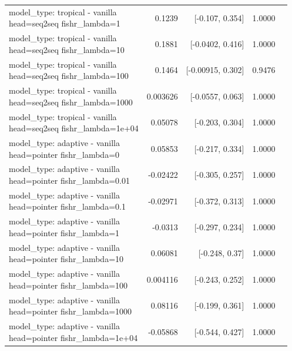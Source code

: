 \documentclass[10pt]{article}
\makeatletter
\newcommand{\stackcell}[1]{\begin{tabular}[t]{@{}l@{}}#1\end{tabular}}
\makeatother
\begin{document}
{\begin{longtable}{lrrrl}
\stackcell{model\_type: tropical - vanilla\\\footnotesize head=seq2seq fishr\_lambda=1 } & 0.1239 & [-0.107, 0.354] & 1.0000 & \\
\stackcell{model\_type: tropical - vanilla\\\footnotesize head=seq2seq fishr\_lambda=10 } & 0.1881 & [-0.0402, 0.416] & 1.0000 & \\
\stackcell{model\_type: tropical - vanilla\\\footnotesize head=seq2seq fishr\_lambda=100 } & 0.1464 & [-0.00915, 0.302] & 0.9476 & \\
\stackcell{model\_type: tropical - vanilla\\\footnotesize head=seq2seq fishr\_lambda=1000 } & 0.003626 & [-0.0557, 0.063] & 1.0000 & \\
\stackcell{model\_type: tropical - vanilla\\\footnotesize head=seq2seq fishr\_lambda=1e+04 } & 0.05078 & [-0.203, 0.304] & 1.0000 & \\
\stackcell{model\_type: adaptive - vanilla\\\footnotesize head=pointer fishr\_lambda=0 } & 0.05853 & [-0.217, 0.334] & 1.0000 & \\
\stackcell{model\_type: adaptive - vanilla\\\footnotesize head=pointer fishr\_lambda=0.01 } & -0.02422 & [-0.305, 0.257] & 1.0000 & \\
\stackcell{model\_type: adaptive - vanilla\\\footnotesize head=pointer fishr\_lambda=0.1 } & -0.02971 & [-0.372, 0.313] & 1.0000 & \\
\stackcell{model\_type: adaptive - vanilla\\\footnotesize head=pointer fishr\_lambda=1 } & -0.0313 & [-0.297, 0.234] & 1.0000 & \\
\stackcell{model\_type: adaptive - vanilla\\\footnotesize head=pointer fishr\_lambda=10 } & 0.06081 & [-0.248, 0.37] & 1.0000 & \\
\stackcell{model\_type: adaptive - vanilla\\\footnotesize head=pointer fishr\_lambda=100 } & 0.004116 & [-0.243, 0.252] & 1.0000 & \\
\stackcell{model\_type: adaptive - vanilla\\\footnotesize head=pointer fishr\_lambda=1000 } & 0.08116 & [-0.199, 0.361] & 1.0000 & \\
\stackcell{model\_type: adaptive - vanilla\\\footnotesize head=pointer fishr\_lambda=1e+04 } & -0.05868 & [-0.544, 0.427] & 1.0000 & \\

\end{longtable}}
\end{document}
